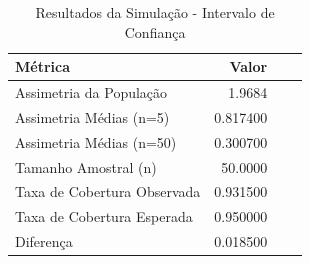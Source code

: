 \begin{table}[H]
\centering
\caption{Resultados da Simulação - Intervalo de Confiança}
\label{tab:resultados_tcl}
\begin{tabular}{lrrr}
\toprule
Métrica & Valor \\
\midrule
Assimetria da População & 1.9684 \\
Assimetria Médias (n=5) & 0.817400 \\
Assimetria Médias (n=50) & 0.300700 \\
Tamanho Amostral (n) & 50.0000 \\
Taxa de Cobertura Observada & 0.931500 \\
Taxa de Cobertura Esperada & 0.950000 \\
Diferença & 0.018500 \\
\bottomrule
\end{tabular}
\end{table}